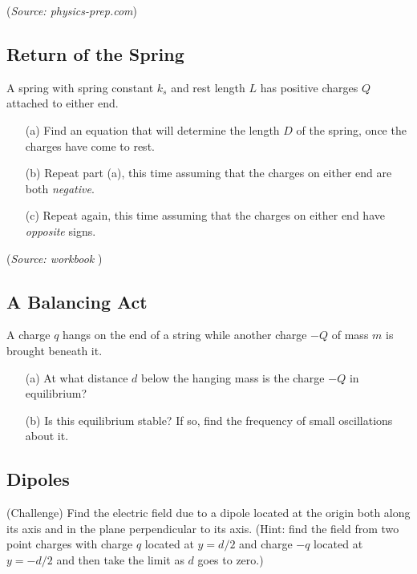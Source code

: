\documentclass{article}
\begin{document}
(\textit{Source: physics-prep.com})

\subsection{Return of the Spring}

A spring with spring constant $k_s$ and rest length $L$ has positive charges $Q$ attached to either end.
\begin{itemize}
	\item[(a)] Find an equation that will determine the length $D$ of the spring, once the charges have come to rest.
	\item[(b)] Repeat part (a), this time assuming that the charges on either end are both \textit{negative}.
	\item[(c)] Repeat again, this time assuming that the charges on either end have \textit{opposite} signs.
\end{itemize}

(\textit{Source: workbook })

\subsection{A Balancing Act}

A charge $q$ hangs on the end of a string while another charge $-Q$ of mass $m$ is brought beneath it.
\begin{itemize}
	\item[(a)] At what distance $d$ below the hanging mass is the charge $-Q$ in equilibrium?
	\item[(b)] Is this equilibrium stable? If so, find the frequency of small oscillations about it.
\end{itemize}

\subsection{Dipoles}

(Challenge) Find the electric field due to a dipole located at the origin both along its axis and in the plane perpendicular to its axis. (Hint: find the field from two point charges with charge $q$ located at $y=d/2$ and charge $-q$ located at $y=-d/2$ and then take the limit as $d$ goes to zero.)
\end{document}
